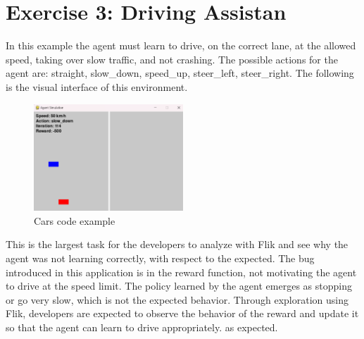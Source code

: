 \section{Exercise 3: Driving Assistan}
\label{sec:cars-eval}
In this example the agent must learn to drive, on the correct lane, at the allowed speed, taking over slow 
traffic, and not crashing. The possible actions for the agent are: straight, slow\_down, speed\_up, 
steer\_left, steer\_right. The following is the visual interface of this environment.

\begin{figure}[h]
    \centering
    \includegraphics[width=0.5\textwidth]{figures/cars_example.png}
    \caption{Cars code example}
    \label{fig:cars-code-example}
\end{figure}

This is the largest task for the developers to analyze with \ac{Flik} and see why the agent was not learning
correctly, with respect to the expected. The bug introduced in this application is in the reward function,
not motivating the agent to drive at the speed limit. The policy learned by the agent emerges as stopping 
or go very slow, which is not the expected behavior. Through exploration using \ac{Flik}, developers are 
expected to observe the behavior of the reward and update it so that the agent can learn to drive appropriately.
as expected.

